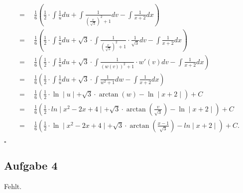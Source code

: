 \documentclass[12pt]{article}
\newcommand{\QED}{\begin{flushright} $\square$ \end{flushright}}
\begin{document}
\begin{align*}
	= \enspace &\frac{1}{6} \left(\frac{1}{2} \cdot \int \frac{1}{u} du + \int \frac{1}{(\frac{v}{\sqrt{3}})^2 + 1} dv - \int \frac{1}{x+2} dx\right) \\
	= \enspace &\frac{1}{6} \left(\frac{1}{2} \cdot \int \frac{1}{u} du + \sqrt{3} \cdot \int \frac{1}{(\frac{v}{\sqrt{3}})^2 + 1} \cdot \frac{1}{\sqrt{3}} dv - \int \frac{1}{x+2} dx\right) \\
	= \enspace &\frac{1}{6} \left(\frac{1}{2} \cdot \int \frac{1}{u} du + \sqrt{3} \cdot \int \frac{1}{(w(v))^2 + 1} \cdot w'(v) dv - \int \frac{1}{x+2} dx\right) \\
	= \enspace &\frac{1}{6} \left(\frac{1}{2} \cdot \int \frac{1}{u} du + \sqrt{3} \cdot \int \frac{1}{w^2 + 1} dw - \int \frac{1}{x+2} dx\right) \\
	= \enspace &\frac{1}{6} \left(\frac{1}{2} \cdot \ln\mid u \mid + \sqrt{3} \cdot \arctan(w) - \ln\mid x+2 \mid \right) + C\\
	= \enspace &\frac{1}{6} \left( \frac{1}{2} \cdot ln\mid x^2-2x+4\mid + \sqrt{3} \cdot \arctan(\frac{v}{\sqrt{3}}) - \ln\mid x+2\mid\right) + C \\
	= \enspace &\frac{1}{6} \left(\frac{1}{2} \cdot \ln\mid x^2-2x+4\mid + \sqrt{3} \cdot \arctan\left(\frac{x-1}{\sqrt{3}}\right) - ln\mid x+2\mid \right) + C.
\end{align*}
\QED

\subsection*{Aufgabe 4}
Fehlt.
\end{document}
